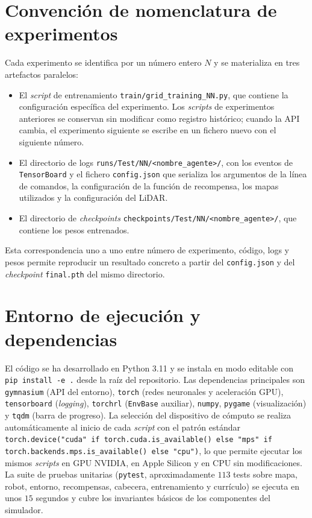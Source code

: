 \section{Convención de nomenclatura de experimentos}\label{apendice:nomenclatura}
Cada experimento se identifica por un número entero $N$ y se materializa
en tres artefactos paralelos:
\begin{itemize}
    \item El \textit{script} de entrenamiento
    \texttt{train/grid\_training\_NN.py}, que contiene la configuración
    específica del experimento. Los \textit{scripts} de experimentos
    anteriores se conservan sin modificar como registro histórico; cuando
    la API cambia, el experimento siguiente se escribe en un fichero
    nuevo con el siguiente número.
    \item El directorio de logs
    \texttt{runs/Test/NN/<nombre\_agente>/}, con los eventos de
    \texttt{TensorBoard} y el fichero \texttt{config.json} que
    serializa los argumentos de la línea de comandos, la configuración
    de la función de recompensa, los mapas utilizados y la
    configuración del LiDAR.
    \item El directorio de \textit{checkpoints}
    \texttt{checkpoints/Test/NN/<nombre\_agente>/}, que contiene los
    pesos entrenados.
\end{itemize}

Esta correspondencia uno a uno entre número de experimento, código,
logs y pesos permite reproducir un resultado concreto a partir del
\texttt{config.json} y del \textit{checkpoint} \texttt{final.pth} del
mismo directorio.

\section{Entorno de ejecución y dependencias}\label{apendice:entorno}
El código se ha desarrollado en Python 3.11 y se instala en modo
editable con \texttt{pip install -e .} desde la raíz del repositorio.
Las dependencias principales son \texttt{gymnasium} (API del entorno),
\texttt{torch} (redes neuronales y aceleración GPU),
\texttt{tensorboard} (\textit{logging}),
\texttt{torchrl} (\texttt{EnvBase} auxiliar), \texttt{numpy},
\texttt{pygame} (visualización) y \texttt{tqdm} (barra de progreso). La
selección del dispositivo de cómputo se realiza automáticamente al
inicio de cada \textit{script} con el patrón estándar
\texttt{torch.device("cuda" if torch.cuda.is\_available() else "mps" if torch.backends.mps.is\_available() else "cpu")},
lo que permite ejecutar los mismos \textit{scripts} en GPU NVIDIA, en
Apple Silicon y en CPU sin modificaciones. La suite de pruebas
unitarias (\texttt{pytest}, aproximadamente $113$ tests sobre mapa,
robot, entorno, recompensas, cabecera, entrenamiento y currículo) se
ejecuta en unos $15$ segundos y cubre los invariantes básicos de los
componentes del simulador.
